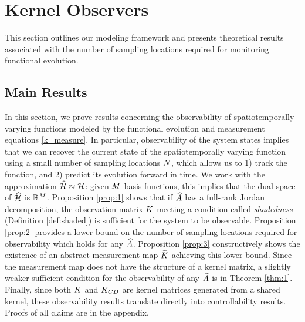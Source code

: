 \vspace{-0.1in}
\section{Kernel Observers}\label{sec:observers}

This section outlines our modeling framework and presents theoretical results associated with the number of sampling locations required for monitoring functional evolution. 

\vspace{-0.1in}




\subsection{Main Results}\label{sec:theory_results}
In this section, we prove results concerning the observability of spatiotemporally varying functions modeled by the functional evolution and measurement equations \eqref{k_measure}. In particular,  observability of the system states implies that we can recover the current state of the spatiotemporally varying function using a small number of sampling locations $N$, which allows us to 1) track the function, and 2) predict its evolution forward in time. We work with the approximation $\widehat{\mathcal{H}}\approx\mathcal{H}$: given $M$ basis functions, this implies that the dual space of $\widehat{\mathcal{H}}$ is $\mathbb{R}^{M}$.
Proposition \ref{prop:1} shows that if $\widehat{A}$ has a full-rank Jordan decomposition, the observation matrix $K$ meeting a condition called \emph{shadedness} (Definition \ref{def:shaded}) is sufficient for the system to be observable. Proposition \ref{prop:2} provides a lower bound on the number of sampling locations required for observability which holds for any $\widehat{A}$.  Proposition \ref{prop:3} constructively shows the existence of an abstract measurement map $\widetilde{K}$ achieving this lower bound. Since the measurement map does not have the structure of a kernel matrix, a slightly weaker sufficient condition for the observability of any $\widehat{A}$ is in Theorem \ref{thm:1}. Finally, since both $K$ and $K_{CD}$ are kernel matrices generated from a shared kernel, these observability results translate directly into controllability results. Proofs of all claims are in the appendix. 

